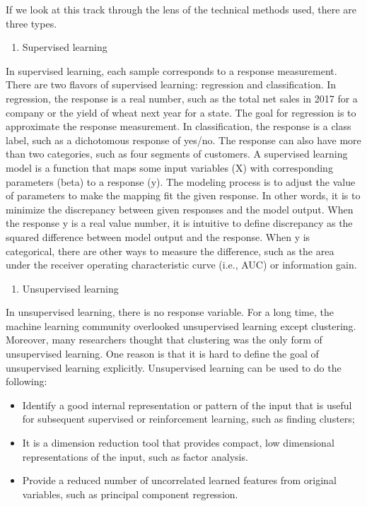 \documentclass[
  12pt,
]{krantz}
\providecommand{\tightlist}{%
  \setlength{\itemsep}{0pt}\setlength{\parskip}{0pt}}
\begin{document}
If we look at this track through the lens of the technical methods used, there are three types.

\begin{enumerate}
\def\labelenumi{(\arabic{enumi})}
\tightlist
\item
  Supervised learning
\end{enumerate}

In supervised learning, each sample corresponds to a response measurement. There are two flavors of supervised learning: regression and classification. In regression, the response is a real number, such as the total net sales in 2017 for a company or the yield of wheat next year for a state. The goal for regression is to approximate the response measurement. In classification, the response is a class label, such as a dichotomous response of yes/no. The response can also have more than two categories, such as four segments of customers. A supervised learning model is a function that maps some input variables (X) with corresponding parameters (beta) to a response (y). The modeling process is to adjust the value of parameters to make the mapping fit the given response. In other words, it is to minimize the discrepancy between given responses and the model output. When the response y is a real value number, it is intuitive to define discrepancy as the squared difference between model output and the response. When y is categorical, there are other ways to measure the difference, such as the area under the receiver operating characteristic curve (i.e., AUC) or information gain.

\begin{enumerate}
\def\labelenumi{(\arabic{enumi})}
\setcounter{enumi}{1}
\tightlist
\item
  Unsupervised learning
\end{enumerate}

In unsupervised learning, there is no response variable. For a long time, the machine learning community overlooked unsupervised learning except clustering. Moreover, many researchers thought that clustering was the only form of unsupervised learning. One reason is that it is hard to define the goal of unsupervised learning explicitly. Unsupervised learning can be used to do the following:

\begin{itemize}
\item
  Identify a good internal representation or pattern of the input that is useful for subsequent supervised or reinforcement learning, such as finding clusters;
\item
  It is a dimension reduction tool that provides compact, low dimensional representations of the input, such as factor analysis.
\item
  Provide a reduced number of uncorrelated learned features from original variables, such as principal component regression.
\end{itemize}
\end{document}
